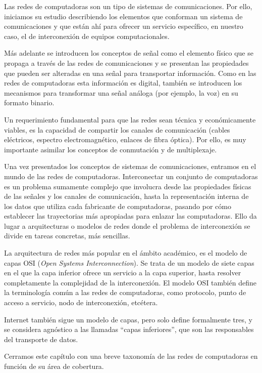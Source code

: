 \documentclass[
]{book}
\begin{document}
Las redes de computadoras son un tipo de sistemas de comunicaciones. Por ello, iniciamos su estudio describiendo los elementos que conforman un sistema de comunicaciones y que están ahí para ofrecer un servicio específico, en nuestro caso, el de interconexión de equipos computacionales.

Más adelante se introducen los conceptos de señal como el elemento físico que se propaga a través de las redes de comunicaciones y se presentan las propiedades que pueden ser alteradas en una señal para transportar información. Como en las redes de computadoras esta información es digital, también se introducen los mecanismos para transformar una señal análoga (por ejemplo, la voz) en su formato binario.

Un requerimiento fundamental para que las redes sean técnica y económicamente viables, es la capacidad de compartir los canales de comunicación (cables eléctricos, espectro electromagnético, enlaces de fibra óptica). Por ello, es muy importante asimilar los conceptos de conmutación y de multiplexaje.

Una vez presentados los conceptos de sistemas de comunicaciones, entramos en el mundo de las redes de computadoras. Interconectar un conjunto de computadoras es un problema sumamente complejo que involucra desde las propiedades físicas de las señales y los canales de comunicación, hasta la representación interna de los datos que utiliza cada fabricante de computadoras, pasando por cómo establecer las trayectorias más apropiadas para enlazar las computadoras.
Ello da lugar a arquitecturas o modelos de redes donde el problema de interconexión se divide en tareas concretas, más sencillas.

La arquitectura de redes más popular en el ámbito académico, es el modelo de capas OSI (\emph{Open Systems Interconnection}). Se trata de un modelo de siete capas en el que la capa inferior ofrece un servicio a la capa superior, hasta resolver completamente la complejidad de la interconexión. El modelo OSI también define la terminología común a las redes de computadoras, como protocolo, punto de acceso a servicio, nodo de interconexión, etcétera.

Internet también sigue un modelo de capas, pero solo define formalmente tres, y se considera agnóstico a las llamadas ``capas inferiores'', que son las responsables del transporte de datos.

Cerramos este capítulo con una breve taxonomía de las redes de computadoras en función de su área de cobertura.
\end{document}
